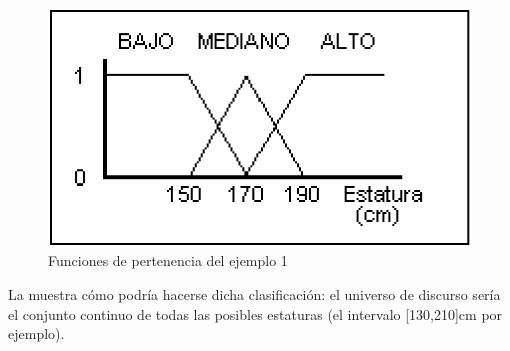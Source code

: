 \begin{figure}[H]
	\centering
	\includegraphics[scale=0.3]{images/fuzzy_example.png}
	\caption{Funciones de pertenencia del ejemplo 1}
	\label{fig:ej1}
\end{figure}
La  muestra cómo podría hacerse dicha clasificación: el universo de
discurso sería el conjunto continuo de todas las posibles estaturas (el
intervalo [130,210]cm por ejemplo). 

